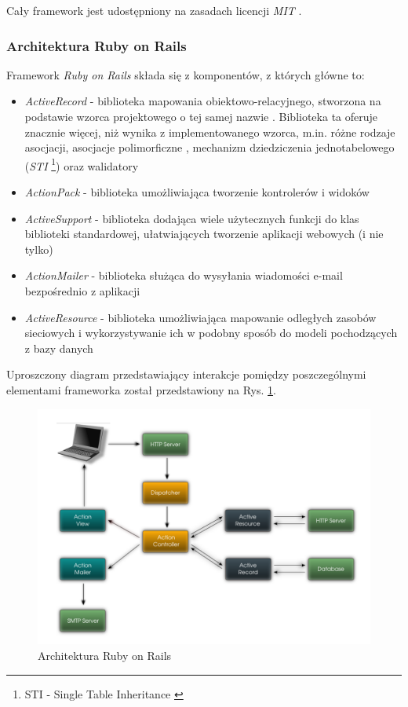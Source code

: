 \documentclass[a4paper,12pt]{article}
\providecommand{\imref}[1]{Rys. \ref{#1}} %
\begin{document}
Cały framework jest udostępniony na zasadach licencji \emph{MIT}
\cite{mit}.

\subsubsection{Architektura Ruby on Rails}
Framework \emph{Ruby on Rails} składa się z komponentów, z których
główne to:

\begin{itemize}
\item \emph{ActiveRecord} - biblioteka mapowania
  obiektowo-relacyjnego, stworzona na podstawie wzorca projektowego o
  tej samej nazwie \cite{activerecord}. Biblioteka ta oferuje znacznie
  więcej, niż wynika z implementowanego wzorca, m.in. różne rodzaje
  asocjacji, asocjacje polimorficzne \cite{polymorphic}, mechanizm
  dziedziczenia jednotabelowego (\emph{STI} \footnote{STI - Single
    Table Inheritance \cite{sti}}) oraz walidatory
\item \emph{ActionPack} - biblioteka umożliwiająca tworzenie
  kontrolerów i widoków
\item \emph{ActiveSupport} - biblioteka dodająca wiele użytecznych
  funkcji do klas biblioteki standardowej, ułatwiających tworzenie
  aplikacji webowych (i nie tylko)
\item \emph{ActionMailer} - biblioteka służąca do wysyłania wiadomości
  e-mail bezpośrednio z aplikacji
\item \emph{ActiveResource} - biblioteka umożliwiająca mapowanie
  odległych zasobów sieciowych i wykorzystywanie ich w podobny sposób
  do modeli pochodzących z bazy danych
\end{itemize}

Uproszczony diagram przedstawiający interakcje pomiędzy poszczególnymi
elementami frameworka został przedstawiony na
\imref{railsarchitecture}.

\begin{figure}[ht]
  \begin{center}
    \includegraphics[width=\linewidth]{railsarchitecture.png}
  \end{center}
  \caption{Architektura Ruby on Rails}
  \label{railsarchitecture}
\end{figure}
\end{document}
